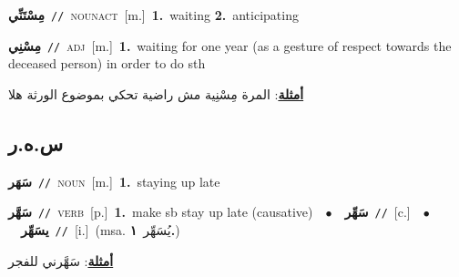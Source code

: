 \documentclass[10pt,a4paper,twoside]{article} %
\begin{document}
\begin{multicols}{2}
{\setlength\topsep{0pt}\textbf{\foreignlanguage{arabic}{مِسْتَنِّي}}\ {\color{gray}\texttt{//}\color{black}}\ \textsc{noun\textunderscore act}\ [m.]\ \textbf{1.}~waiting  \textbf{2.}~anticipating\ } \vspace{2mm}

{\setlength\topsep{0pt}\textbf{\foreignlanguage{arabic}{مِسْنِي}}\ {\color{gray}\texttt{//}\color{black}}\ \textsc{adj}\ [m.]\ \textbf{1.}~waiting for one year (as a gesture of respect towards the deceased person) in order to do sth\  \begin{flushright}\color{gray}\foreignlanguage{arabic}{\textbf{\underline{\foreignlanguage{arabic}{أمثلة}}}: المرة مِسْنِية مش راضية تحكي بموضوع الورثة هلا}\end{flushright}\color{black}} \vspace{2mm}

\vspace{-3mm}
\subsection*{\color{blue}\foreignlanguage{arabic}{س.ه.ر}\color{blue}{}} 

{\setlength\topsep{0pt}\textbf{\foreignlanguage{arabic}{سَهَر}}\ {\color{gray}\texttt{//}\color{black}}\ \textsc{noun}\ [m.]\ \textbf{1.}~staying up late\ } \vspace{2mm}

{\setlength\topsep{0pt}\textbf{\foreignlanguage{arabic}{سَهَّر}}\ {\color{gray}\texttt{//}\color{black}}\ \textsc{verb}\ [p.]\ \textbf{1.}~make sb stay up late (causative)\ \ $\bullet$\ \ \setlength\topsep{0pt}\textbf{\foreignlanguage{arabic}{سَهِّر}}\ {\color{gray}\texttt{//}\color{black}}\ [c.]\ \ $\bullet$\ \ \setlength\topsep{0pt}\textbf{\foreignlanguage{arabic}{يسَهِّر}}\ {\color{gray}\texttt{//}\color{black}}\ [i.]\ \color{gray}(msa. \foreignlanguage{arabic}{يُسَهِّر}~\foreignlanguage{arabic}{\textbf{١.}})\color{black}\  \begin{flushright}\color{gray}\foreignlanguage{arabic}{\textbf{\underline{\foreignlanguage{arabic}{أمثلة}}}: سَهَّرني للفجر}\end{flushright}\color{black}} \vspace{2mm}


\end{multicols}
\end{document}

